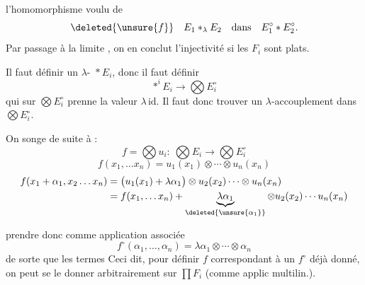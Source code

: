 l'homomorphisme voulu de
\[
\deleted{\unsure{f}}\quad E_1\mathbin{*}_{\lambda}E_2\quad\text{dans}\quad E_1^\circ * E_2^\circ.
\]
Par passage à la limite , on en conclut l'injectivité si les $F_i$ sont plats.

Il faut définir un $\lambda$-  $\mathop{*}E_i$, donc il faut définir
\[
\mathop{*}^{i}E_i\longrightarrow\bigotimes E_i^\circ
\]
qui sur $\bigotimes E_i^\circ$ prenne la valeur $\lambda\,\mathrm{id}$.
Il faut donc trouver un $\lambda$-accouplement  dans $\bigotimes E_i^\circ$.

On songe  de suite à :
\[
f=\bigotimes u_i:\ \bigotimes E_i\longrightarrow\bigotimes E_i^\circ
\]
\[
f(x_1,\ldots x_n)=u_1(x_1)\otimes\cdots\otimes u_n(x_n)
\]
\[
\begin{aligned}
f(x_1+\alpha_1,x_2\ldots x_n)
 &=\bigl(u_1(x_1)+\lambda\alpha_1\bigr)\otimes u_2(x_2)\cdots\otimes u_n(x_n)\\
 &=f(x_1,\ldots x_n)+\underbrace{\lambda\alpha_1}_{\deleted{\unsure{\alpha_1}}}\otimes u_2(x_2)\cdots u_n(x_n)
\end{aligned}
\]

prendre donc comme application associée
\[
f^\circ(\alpha_1,\ldots,\alpha_n)=\lambda\alpha_1\otimes\cdots\otimes\alpha_n
\]
de sorte que les termes  
Ceci dit, pour définir  $f$  correspondant à un $f^\circ$ déjà donné, on peut se le donner arbitrairement  sur $\prod F_i$ (comme applic multilin.).

